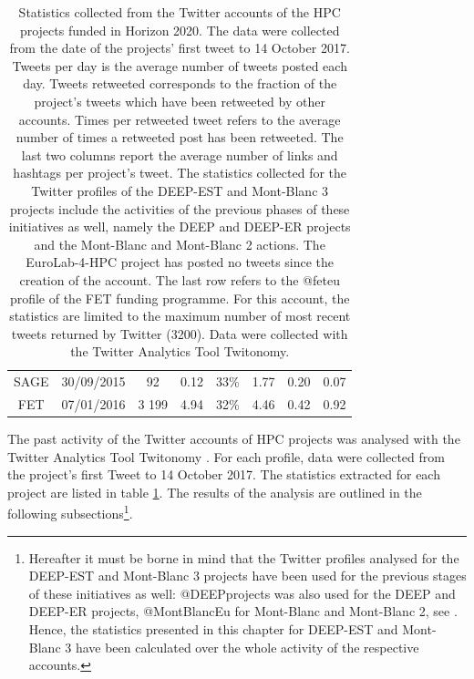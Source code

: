 {\begin{landscape}
\begin{table}
\begin{adjustwidth}{-1.5cm}{}
{\begin{tabular}{*{8}{c}}
       SAGE & 30/09/2015 & 92 & 0.12 & 33\% & 1.77 & 0.20 & 0.07 \\ 
       FET & 07/01/2016 & 3 199 & 4.94 & 32\% & 4.46 & 0.42 & 0.92 \\
       \hline
       \hline
    \end{tabular}
   }     
   \caption{Statistics collected from the Twitter accounts of the HPC projects funded in Horizon 2020. The data were collected from the date of the projects' first tweet to 14 October 2017. Tweets per day is the average number of tweets posted each day. Tweets retweeted corresponds to the fraction of the project's tweets which have been retweeted by other accounts. Times per retweeted tweet refers to the average number of times a retweeted post has been retweeted. The last two columns report the average number of links and hashtags per project's tweet. The statistics collected for the Twitter profiles of the DEEP-EST and Mont-Blanc 3 projects include the activities of the previous phases of these initiatives as well, namely the DEEP and DEEP-ER projects and the Mont-Blanc and Mont-Blanc 2 actions. The EuroLab-4-HPC project has posted no tweets since the creation of the account. The last row refers to the @fet\textunderscore eu profile of the FET funding programme. For this account, the statistics are limited to the maximum number of most recent tweets returned by Twitter (3200). Data were collected with the Twitter Analytics Tool Twitonomy.} \label{HPC_Twitter_activity}
   \end{adjustwidth} 
   \end{table}
   \end{landscape}
 \clearpage
}

The past activity of the Twitter accounts of HPC projects was analysed with the Twitter Analytics Tool Twitonomy \cite{Twitonomy}. For each profile, data were collected from the project's first Tweet to 14 October 2017. The statistics extracted for each project are listed in table \ref{HPC_Twitter_activity}. The results of the analysis are outlined in the following subsections\footnote{Hereafter it must be borne in mind that the Twitter profiles analysed for the DEEP-EST and Mont-Blanc 3 projects have been used for the previous stages of these initiatives as well: @DEEPprojects was also used for the DEEP and DEEP-ER projects, @MontBlanc\textunderscore Eu for Mont-Blanc and Mont-Blanc 2, see \cite{DEEPprojects,MontBlanc}. Hence, the statistics presented in this chapter for DEEP-EST and Mont-Blanc 3 have been calculated over the whole activity of the respective accounts.}.

